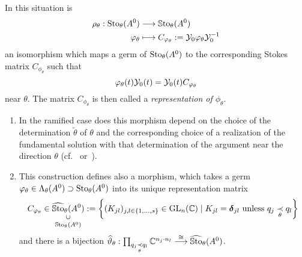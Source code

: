 \begin{prop}\label{prop:representation}
  In this situation is
  \begin{align*}
    \rho_{\theta}:\operatorname{Sto}_\theta(A^0)&\longrightarrow\operatorname{\mathbb{S}to}_\theta(A^0)
    \\\varphi_\theta
    &\longmapsto
    C_{\varphi_\theta}:=\mathcal{Y}_{0}\varphi_\theta\mathcal{Y}_{0}^{-1}
  \end{align*}
  an isomorphism which maps a germ of $\operatorname{Sto}_\theta(A^0)$ to the corresponding
  Stokes matrix $C_{\phi_\theta}$ such that
  \begin{equation}\label{eq:representation}
    \varphi_\theta(t)\mathcal{Y}_{0}(t)=\mathcal{Y}_{0}(t)C_{\varphi_\theta}
  \end{equation}
  near $\theta$.
  The matrix $C_{\phi_\theta}$ is then called a \emph{representation of
  $\phi_\theta$}.
  \begin{s-rem}\label{rem:representation}
    \begin{enumerate}
      \item In the ramified case does this morphism depend on the choice of the
        determination $\tilde\theta$ of $\theta$ and the corresponding choice of
        a realization of the fundamental solution with that determination of the
        argument near the direction $\theta$
        (cf.~\cite{Loday1994} or~\cite[78f]{Loday2014}).
      \item {}
        This construction defines also a morphism, which takes a germ
        $\varphi_\theta\in\Lambda_\theta(A^0)\supset\operatorname{Sto}_\theta(A^0)$ into its
        unique representation matrix
        \[
          C_{\phi_\theta} \in
          \underset{\SSto_\theta(A^0)}{%
            \underset{\text{\rotatebox[origin=c]{90}{$\subset$}}}{%
              \hat\SSto_{\theta}(A^0)}}
          :=
          \left\{(K_{jl})_{j,l\in\{1,\dots,s\}}
            \in \GL_n(\C)\mid K_{jl}=\bdelta_{jl} \text{ unless }
            q_j \underset{\theta}{\prec} q_l \right\}
        \]
        and there is a bijection $\widehat\vartheta_\theta:
        \prod_{q_j\underset{\theta}{\prec}q_l}\mathbb{C}^{n_j \cdot n_l}
        \overset{\cong}{\longrightarrow} \widehat{\operatorname{\mathbb{S}to}}_\theta(A^0)$.
        \begin{comment}
          Does this define a local-constant sheaf
          \[
            I\mapsto \hat\SSto_{I}(A^0)
            :=
            \left\{(K_{jl})_{j,l\in\{1,\dots,s\}}
              \in \GL_n(\C)\mid K_{jl}=\bdelta_{jl} \text{ unless }
              q_j \underset{\theta}{\prec} q_l
              \text{ for some } \theta\in I\right\}
          \]
          and a skyscraper sheaf
          \[
            I\mapsto \SSto_{I}(A^0) \,.
          \]
          \PROBLEM
        \end{comment}
    \end{enumerate}
  \end{s-rem}
\end{prop}
